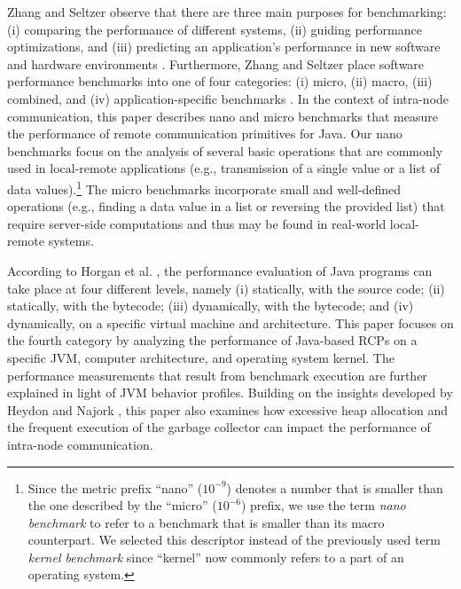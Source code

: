 \documentclass{sig-alternate}
\begin{document}
\begin{sloppypar}
Zhang and Seltzer observe that there are three main purposes for
benchmarking: (i) comparing the performance of different systems, (ii)
guiding performance optimizations, and (iii) predicting an
application's performance in new software and hardware environments
\cite{zhang-hbenchjava}.  Furthermore, Zhang and Seltzer place
software performance benchmarks into one of four categories: (i)
micro, (ii) macro, (iii) combined, and (iv) application-specific
benchmarks \cite{zhang-hbenchjava}.  In the context of intra-node
communication, this paper describes nano and micro benchmarks that
measure the performance of remote communication primitives for Java.
Our nano benchmarks focus on the analysis of several basic operations
that are commonly used in local-remote applications (e.g.,
transmission of a single value or a list of data
values).\footnote{{\small Since the metric prefix ``nano'' ($10^{-9}$)
    denotes a number that is smaller than the one described by the
    ``micro'' ($10^{-6}$) prefix, we use the term {\em nano benchmark}
    to refer to a benchmark that is smaller than its macro
    counterpart.  We selected this descriptor instead of the
    previously used term {\em kernel benchmark} \cite{agarwal-sp2}
    since ``kernel'' now commonly refers to a part of an operating
    system. }}  The micro benchmarks incorporate small and
well-defined operations (e.g., finding a data value in a list or
reversing the provided list) that require server-side computations and
thus may be found in real-world local-remote systems.
\end{sloppypar}

According to Horgan et al. \cite{horgan-measure-runtime}, the
performance evaluation of Java programs can take place at four
different levels, namely (i) statically, with the source code; (ii)
statically, with the bytecode; (iii) dynamically, with the bytecode;
and (iv) dynamically, on a specific virtual machine and architecture.
This paper focuses on the fourth category by analyzing the performance
of Java-based RCPs on a specific JVM, computer architecture, and
operating system kernel. The performance measurements that result from
benchmark execution are further explained in light of JVM behavior
profiles.  Building on the insights developed by Heydon and Najork
\cite{heydon-java-core}, this paper also examines how excessive heap
allocation and the frequent execution of the garbage collector can
impact the performance of intra-node communication.
\end{document}
